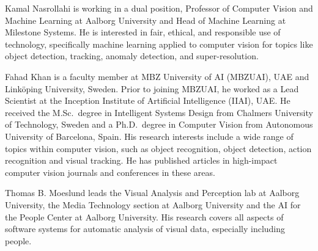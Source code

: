 \documentclass[10pt,journal,compsoc]{IEEEtran}
\begin{document}
\begin{IEEEbiography}
{Kamal Nasrollahi} is working in a dual position, Professor of Computer Vision and Machine Learning at Aalborg University and Head of Machine Learning at Milestone Systems. He is interested in fair, ethical, and responsible use of technology, specifically machine learning applied to computer vision for topics like object detection, tracking, anomaly detection, and super-resolution.
\end{IEEEbiography}

\begin{IEEEbiography}{Fahad Khan} is a faculty member at MBZ University of AI (MBZUAI), UAE and Link\"{o}ping University, Sweden. Prior to joining MBZUAI, he worked as a Lead Scientist at the Inception Institute of Artificial Intelligence (IIAI), UAE. He received the M.Sc.~degree in Intelligent Systems Design from Chalmers University of Technology, Sweden and a Ph.D.~degree in Computer Vision from Autonomous University of Barcelona, Spain. His research interests include a wide range of topics within computer vision, such as object recognition, object detection, action recognition and visual tracking. He has published articles in high-impact computer vision journals and conferences in these areas.
\end{IEEEbiography}

\begin{IEEEbiography}
{Thomas B. Moeslund} leads the Visual Analysis and Perception lab at Aalborg University, the Media Technology section at Aalborg University and the AI for the People Center at Aalborg University. His research covers all aspects of software systems for automatic analysis of visual data, especially including people.


\end{IEEEbiography}
\end{document}
